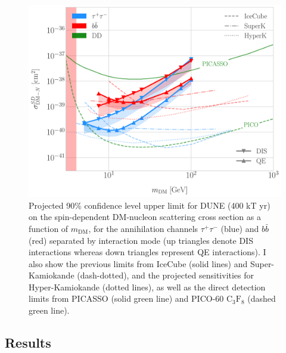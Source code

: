 \begin{figure}[t]
	\centering
	\includegraphics[width=0.95\linewidth]{Images/DM_Analysis/solardm_xsection_sd.pdf}
	\caption[Projected 90\% confidence level upper limit for DUNE (400 kT yr) on the spin-dependent DM-nucleon scattering cross section as a function of $m_{\mathrm{DM}}$, for the annihilation channels $\tau^{+}\tau^{-}$ and $b\bar{b}$ separated by interaction mode]{Projected 90\% confidence level upper limit for DUNE (400 kT yr) on the spin-dependent DM-nucleon scattering cross section as a function of $m_{\mathrm{DM}}$, for the annihilation channels $\tau^{+}\tau^{-}$ (blue) and $b\bar{b}$ (red) separated by interaction mode (up triangles denote DIS interactions whereas down triangles represent QE interactions). I also show the previous limits from IceCube \cite{IceCube2021} (solid lines) and Super-Kamiokande \cite{Super-Kamiokande2015} (dash-dotted), and the projected sensitivities for Hyper-Kamiokande \cite{Bell2021} (dotted lines), as well as the direct detection limits from PICASSO \cite{Behnke2016} (solid green line) and PICO-60 $\mathrm{C}_{3}\mathrm{F}_{8}$ \cite{PICO2019} (dashed green line).}
	\label{fig:solardm_xsection_sd}
\end{figure}

\subsection{Results}

